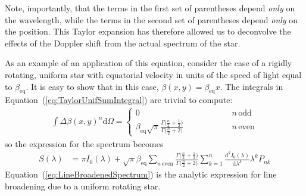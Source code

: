 \documentclass[modern]{aastex62}
\begin{document}
Note, importantly, that the terms in the first set of parentheses depend \emph{only} on the wavelength,
while the terms in the second set of parentheses depend \emph{only} on the position.
This Taylor expansion has therefore allowed us to deconvolve the effects of the Doppler
shift from the actual spectrum of the star.

As an example of an application of this equation, consider the case of a rigidly rotating,
uniform star with equatorial velocity in units of the speed of light equal to $\beta_\mathrm{eq}$. 
It is easy to show that in this case, $\beta(x, y) = \beta_\mathrm{eq} x$. The integrals
in Equation~(\ref{eq:TaylorUnifSumIntegral}) are trivial to compute:
%
\begin{align}
    \int{\Delta\beta(x, y)^n}\mathrm{d}\Omega = 
        \begin{cases} 
            0 & \quad\quad\quad\quad\quad n \, \mathrm{odd} \\
            \beta_\mathrm{eq}\sqrt{\pi}\frac{\Gamma\big(\frac{n}{2} + \frac{1}{2}\big)}{\Gamma\big(\frac{n}{2} + 2\big)} & \quad\quad\quad\quad\quad n \, \mathrm{even}
        \end{cases}
\end{align}
%
so the expression for the spectrum becomes
\begin{align}
    \label{eq:LineBroadenedSpectrum}
    S(\lambda) 
        &=
        \pi I_0(\lambda)
        + 
        \sqrt{\pi}\beta_\mathrm{eq}
        \sum_{n\,\mathrm{even}}
            \frac{\Gamma\big(\frac{n}{2} + \frac{1}{2}\big)}{\Gamma\big(\frac{n}{2} + 2\big)}
            \sum_{k=1}^n 
                \frac{\mathrm{d}^k I_0(\lambda)}{\mathrm{d}\lambda^k} \lambda^k P_{nk} 
\end{align}
%
Equation~(\ref{eq:LineBroadenedSpectrum}) is the analytic expression for line broadening
due to a uniform rotating star.



\end{document}
